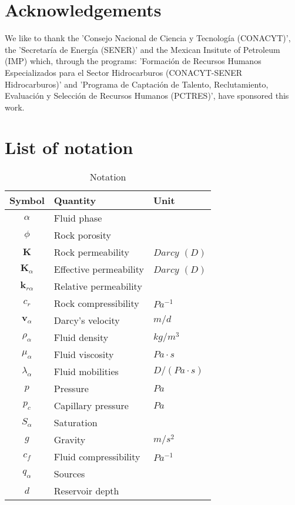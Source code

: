 \documentclass[12pt]{article}
\begin{document}
{\section*{Acknowledgements}
We like to thank the 'Consejo Nacional de Ciencia y Tecnolog\'ia (CONACYT)',
the 'Secretar\'ia de Energ\'ia (SENER)' and the Mexican Insitute of Petroleum (IMP) which,
through the programs: ’Formaci\'on de Recursos Humanos Especializados para
el Sector Hidrocarburos (CONACYT-SENER Hidrocarburos)’ and ’Programa
de Captaci\'on de Talento, Reclutamiento, Evaluaci\'on y Selecci\'on de Recursos
Humanos (PCTRES)’, have sponsored this work.


\newpage

 
 
 \newpage
 
% 
\newpage
\newpage
\appendix
\newpage


\section{List of notation}\label{a1}


\begin{table}[!h]
\centering
\begin{tabular}{c l l }
\hline
Symbol & Quantity & Unit \\[0.5ex]
\hline
$\alpha$ & Fluid phase& \\
$\phi$ & Rock porosity&   \\
 $\mathbf{K}$& Rock permeability&  $Darcy$ $(D)$ \\
  $\mathbf{K}_{\alpha}$& Effective permeability  &  $Darcy$ $(D)$ \\
    $\mathbf{k}_{r\alpha}$& Relative permeability  &  \\
 $c_r$& Rock compressibility&  $Pa^{-1}$ \\
$\mathbf{v}_{\alpha}$ & Darcy's velocity& $ m/d$ \\
$\rho_{\alpha}$ &Fluid density &  $kg/m^3$ \\
 $\mu_{\alpha}$&Fluid viscosity & $Pa \cdot s$   \\
 $\lambda_{\alpha}$&Fluid mobilities& $D/ (Pa \cdot s)$   \\
${p}$  &Pressure &  $Pa$ \\
$p_{c}$  &Capillary pressure &  $Pa$ \\
$S_{\alpha}$  &Saturation &  \\
$g$  &Gravity &  $m/s^2$ \\
$c_f$ &Fluid compressibility &  $Pa^{-1}$ \\
$q_{\alpha}$ &Sources &   \\
$d$ & Reservoir depth& \\
\hline
\end{tabular}\label{table:symbols}
\caption{Notation}
\end{table}
\newpage
}
\end{document}
